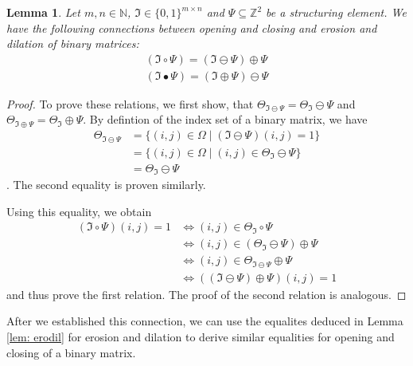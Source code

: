 \documentclass[a4paper,12pt]{article}
\theoremstyle{plain}
\newtheorem{lemma}[theorem]{Lemma}
\theoremstyle{definition}
\begin{document}
\begin{lemma}
	Let $m, n \in \mathbb{N}$, $\mathfrak{I} \in \{ 0, 1 \}^{m \times n}$ and $\Psi \subseteq \mathbb{Z}^2$ be a structuring element. We have the following connections between opening and closing and erosion and dilation of binary matrices:
	\begin{align}
		(\mathfrak{I} \circ \Psi) = (\mathfrak{I} \ominus \Psi) \oplus \Psi \\
		(\mathfrak{I} \bullet \Psi) = (\mathfrak{I} \oplus \Psi) \ominus \Psi
	\end{align}
\end{lemma}
\begin{proof}
	To prove these relations, we first show, that $\Theta_{\mathfrak{I} \ominus \Psi} = \Theta_\mathfrak{I} \ominus \Psi$ and $\Theta_{\mathfrak{I} \oplus \Psi} = \Theta_\mathfrak{I} \oplus \Psi$. By defintion of the index set of a binary matrix, we have
	\begin{align*}
		\Theta_{\mathfrak{I} \ominus \Psi} &= \{ (i, j) \in \Omega \mid (\mathfrak{I} \ominus \Psi)(i, j) = 1 \} \\
		&= \{ (i, j) \in \Omega \mid (i, j) \in \Theta_\mathfrak{I} \ominus \Psi \} \\
		&= \Theta_\mathfrak{I} \ominus \Psi
	\end{align*}.
	The second equality is proven similarly.
	
	Using this equality, we obtain
	\begin{align*}
		(\mathfrak{I} \circ \Psi)(i, j) = 1 &\Leftrightarrow (i, j) \in \Theta_\mathfrak{I} \circ \Psi \\
		&\Leftrightarrow (i, j) \in (\Theta_\mathfrak{I} \ominus \Psi) \oplus \Psi \\
		&\Leftrightarrow (i, j) \in \Theta_{\mathfrak{I} \ominus \Psi} \oplus \Psi \\
		&\Leftrightarrow ((\mathfrak{I} \ominus \Psi) \oplus \Psi)(i, j) = 1
	\end{align*}
	and thus prove the first relation. The proof of the second relation is analogous.
\end{proof}

After we established this connection, we can use the equalites deduced in Lemma \ref{lem: erodil} for erosion and dilation to derive similar equalities for opening and closing of a binary matrix.
\end{document}
